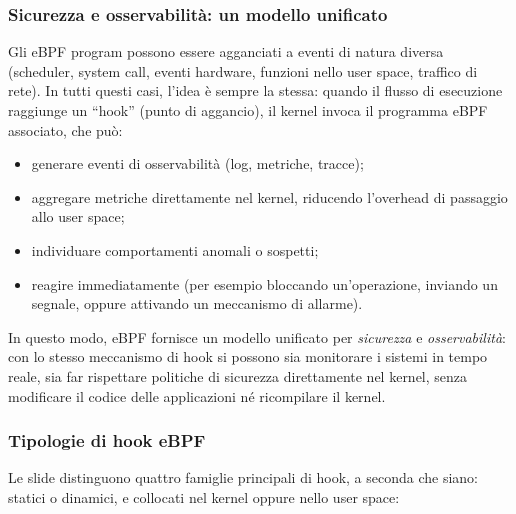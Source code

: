 \subsubsection{Sicurezza e osservabilità: un modello unificato}

Gli eBPF program possono essere agganciati a eventi di natura diversa
(scheduler, system call, eventi hardware, funzioni nello user space, traffico di rete).
In tutti questi casi, l’idea è sempre la stessa: quando il flusso di esecuzione
raggiunge un ``hook'' (punto di aggancio), il kernel invoca il programma eBPF
associato, che può:

\begin{itemize}
  \item generare eventi di osservabilità (log, metriche, tracce);
  \item aggregare metriche direttamente nel kernel, riducendo l’overhead di passaggio allo user space;
  \item individuare comportamenti anomali o sospetti;
  \item reagire immediatamente (per esempio bloccando un’operazione, inviando un segnale,
        oppure attivando un meccanismo di allarme).
\end{itemize}

In questo modo, eBPF fornisce un modello unificato per \emph{sicurezza} e
\emph{osservabilità}: con lo stesso meccanismo di hook si possono sia monitorare
i sistemi in tempo reale, sia far rispettare politiche di sicurezza direttamente
nel kernel, senza modificare il codice delle applicazioni né ricompilare il kernel.

\subsubsection{Tipologie di hook eBPF}

Le slide distinguono quattro famiglie principali di hook, a seconda che siano:
statici o dinamici, e collocati nel kernel oppure nello user space:

